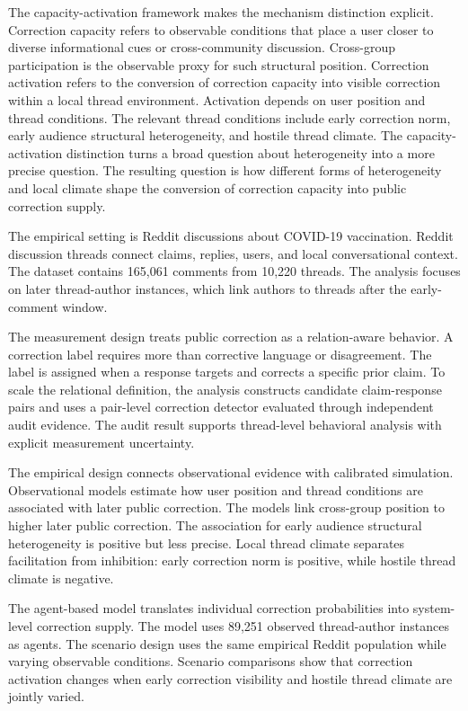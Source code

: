\documentclass[namedate,unnumsec,webpdf,contemporary,large]{oup-authoring-template}
\begin{document}
The capacity-activation framework makes the mechanism distinction explicit. Correction capacity refers to observable conditions that place a user closer to diverse informational cues or cross-community discussion. Cross-group participation is the observable proxy for such structural position. Correction activation refers to the conversion of correction capacity into visible correction within a local thread environment. Activation depends on user position and thread conditions. The relevant thread conditions include early correction norm, early audience structural heterogeneity, and hostile thread climate. The capacity-activation distinction turns a broad question about heterogeneity into a more precise question. The resulting question is how different forms of heterogeneity and local climate shape the conversion of correction capacity into public correction supply.

The empirical setting is Reddit discussions about COVID-19 vaccination. Reddit discussion threads connect claims, replies, users, and local conversational context. The dataset contains 165,061 comments from 10,220 threads. The analysis focuses on later thread-author instances, which link authors to threads after the early-comment window.

The measurement design treats public correction as a relation-aware behavior. A correction label requires more than corrective language or disagreement. The label is assigned when a response targets and corrects a specific prior claim. To scale the relational definition, the analysis constructs candidate claim-response pairs and uses a pair-level correction detector evaluated through independent audit evidence. The audit result supports thread-level behavioral analysis with explicit measurement uncertainty.

The empirical design connects observational evidence with calibrated simulation. Observational models estimate how user position and thread conditions are associated with later public correction. The models link cross-group position to higher later public correction. The association for early audience structural heterogeneity is positive but less precise. Local thread climate separates facilitation from inhibition: early correction norm is positive, while hostile thread climate is negative.

The agent-based model translates individual correction probabilities into system-level correction supply. The model uses 89,251 observed thread-author instances as agents. The scenario design uses the same empirical Reddit population while varying observable conditions. Scenario comparisons show that correction activation changes when early correction visibility and hostile thread climate are jointly varied.
\end{document}
